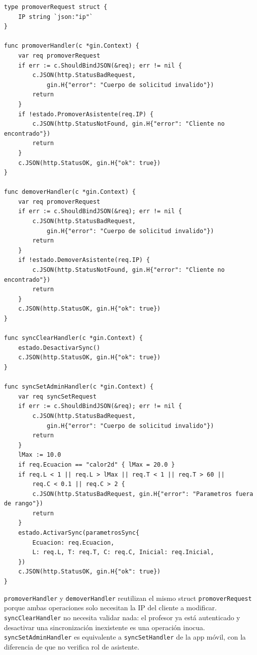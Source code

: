 \documentclass[12pt, a4paper]{article}
\begin{document}
\begin{lstlisting}[style=golang, caption={\texttt{admin.go} — promote, demote y sync}]
type promoverRequest struct {
    IP string `json:"ip"`
}

func promoverHandler(c *gin.Context) {
    var req promoverRequest
    if err := c.ShouldBindJSON(&req); err != nil {
        c.JSON(http.StatusBadRequest,
            gin.H{"error": "Cuerpo de solicitud invalido"})
        return
    }
    if !estado.PromoverAsistente(req.IP) {
        c.JSON(http.StatusNotFound, gin.H{"error": "Cliente no encontrado"})
        return
    }
    c.JSON(http.StatusOK, gin.H{"ok": true})
}

func demoverHandler(c *gin.Context) {
    var req promoverRequest
    if err := c.ShouldBindJSON(&req); err != nil {
        c.JSON(http.StatusBadRequest,
            gin.H{"error": "Cuerpo de solicitud invalido"})
        return
    }
    if !estado.DemoverAsistente(req.IP) {
        c.JSON(http.StatusNotFound, gin.H{"error": "Cliente no encontrado"})
        return
    }
    c.JSON(http.StatusOK, gin.H{"ok": true})
}

func syncClearHandler(c *gin.Context) {
    estado.DesactivarSync()
    c.JSON(http.StatusOK, gin.H{"ok": true})
}

func syncSetAdminHandler(c *gin.Context) {
    var req syncSetRequest
    if err := c.ShouldBindJSON(&req); err != nil {
        c.JSON(http.StatusBadRequest,
            gin.H{"error": "Cuerpo de solicitud invalido"})
        return
    }
    lMax := 10.0
    if req.Ecuacion == "calor2d" { lMax = 20.0 }
    if req.L < 1 || req.L > lMax || req.T < 1 || req.T > 60 ||
        req.C < 0.1 || req.C > 2 {
        c.JSON(http.StatusBadRequest, gin.H{"error": "Parametros fuera de rango"})
        return
    }
    estado.ActivarSync(parametrosSync{
        Ecuacion: req.Ecuacion,
        L: req.L, T: req.T, C: req.C, Inicial: req.Inicial,
    })
    c.JSON(http.StatusOK, gin.H{"ok": true})
}
\end{lstlisting}

\texttt{promoverHandler} y \texttt{demoverHandler} reutilizan el mismo struct
\texttt{promoverRequest} porque ambas operaciones solo necesitan la IP del cliente
a modificar. \texttt{syncClearHandler} no necesita validar nada: el profesor ya está
autenticado y desactivar una sincronización inexistente es una operación inocua.
\texttt{syncSetAdminHandler} es equivalente a \texttt{syncSetHandler} de la app móvil,
con la diferencia de que no verifica rol de asistente.
\end{document}
